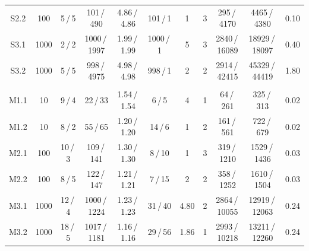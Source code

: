 \begin{table}
{\begin{tabular}{@{\extracolsep{4pt}}ccccccccccc@{}}
S2.2 & 100 		& 5\,/\,5 		& 101\,/\,490 			& 4.86\,/\,4.86 	& 101\,/\,1 	& 1 & 3 	& 295\,/\,4170 			& 4465\,/\,4380         & 0.10      \\	%
S3.1 & 1000 	& 2\,/\,2 		& 1000\,/\,1997 		& 1.99\,/\,1.99 	& 1000\,/\,1 	& 5 & 3 	& 2840\,/\,16089 		& 18929\,/\,18097       & 0.40      \\	%
S3.2 & 1000 	& 5\,/\,5 		& 998\,/\,4975 			& 4.98\,/\,4.98 	& 998\,/\,1 	& 2 & 2 	& 2914\,/\,42415 		& 45329\,/\,44419       & 1.80      \\	%
	 &  		&  				&  					&  				&  			&   &   &  	&             \\	                
M1.1 & 10 		& 9\,/\,4 		& 22\,/\,33 			& 1.54\,/\,1.54 	& 6\,/\,5 		& 4 & 1 	& 64\,/\,261 			& 325\,/\,313           & 0.02      \\   %
M1.2 & 10 		& 8\,/\,2 		& 55\,/\,65 			& 1.20\,/\,1.20 	& 14\,/\,6 		& 1 & 2 	& 161\,/\,561 			& 722\,/\,679           & 0.02      \\   %
M2.1 & 100 		& 10\,/\,3 		& 109\,/\,141 			& 1.30\,/\,1.30 	& 8\,/\,10 		& 1 & 3 	& 319\,/\,1210 			& 1529\,/\,1436         & 0.03      \\   %
M2.2 & 100 		& 8\,/\,5 		& 122\,/\,147 			& 1.21\,/\,1.21 	& 7\,/\,15 		& 2 & 2 	& 358\,/\,1252 			& 1610\,/\,1504         & 0.03      \\   %
M3.1 & 1000 	& 12\,/\,4 		& 1000\,/\,1224 		& 1.23\,/\,1.23 	& 31\,/\,40 	& 4.80 & 2 	& 2864\,/\,10055 		& 12919\,/\,12063       & 0.24      \\	 %
M3.2 & 1000 	& 18\,/\,5 		& 1017\,/\,1181 		& 1.16\,/\,1.16 	& 29\,/\,56 	& 1.86 & 1 	& 2993\,/\,10218 		& 13211\,/\,12260       & 0.24      \\	 %


\end{tabular}}
\end{table}
